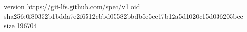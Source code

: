 version https://git-lfs.github.com/spec/v1
oid sha256:0f80332b1bdda7e2f6512cbbd05582bbdb5e5ce17b12a5d1020c15d036205bcc
size 196704

